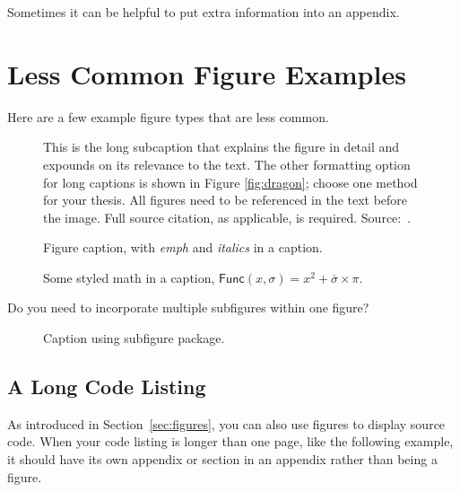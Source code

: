 Sometimes it can be helpful to put extra information into an appendix.

\section{Less Common Figure Examples} \label{sec:uncommon-figures}
Here are a few example figure types that are less common.

\begin{figure}[H] %
    \framebox[\textwidth]{\parbox{\textwidth}{\lipsum[65]}}
    \caption*{\small This is the long subcaption that explains the figure in detail and expounds on its relevance to the text. The other formatting option for long captions is shown in Figure \ref{fig:dragon}; choose one method for your thesis. All figures need to be referenced in the text before the image. Full source citation, as applicable, is required. Source:~\citet{Wunkerbunk:2002}.} \vspace*{1.5em}
    \caption{Figure caption, with \emph{emph} and \textit{italics} in a caption.}
\end{figure}

\begin{figure}[H] %
    \framebox[\textwidth]{\parbox{\textwidth}{\lipsum[65]}}
    \caption{Some styled math in a caption, $\mathsf{Func}(x, \sigma) = x^2 + \overline{\sigma} \times \pi$.}
\end{figure}

Do you need to incorporate multiple subfigures within one figure?

\begin{figure}[H] %
    \centering
    \hfill
    
    \caption{Caption using subfigure package.}
\end{figure}

\subsection{A Long Code Listing}
As introduced in Section~\ref{sec:figures}, you can also use figures to display source code.
When your code listing is longer than one page, like the following example, it should have its own appendix or section in an appendix rather than being a figure.

